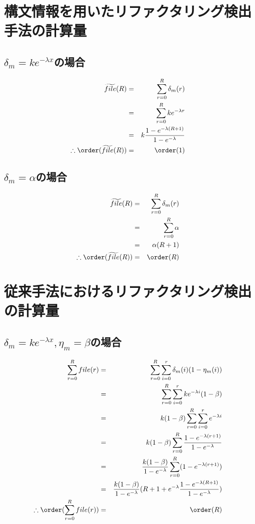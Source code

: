\section{構文情報を用いたリファクタリング検出手法の計算量}\label{appendix:computation}
\subsection{$\delta_m = k e^{-\lambda x}$の場合}
\begin{eqnarray*}
	\widetilde{file}(R) &=& \sum_{r=0}^R \delta_m (r) \\
	&=& \sum_{r=0}^R ke^{-\lambda r} \\
	&=& k \frac{1 - e^{-\lambda (R+1)}}{1 - e^{- \lambda}} \\
	\therefore \order(\widetilde{file}(R)) &=& \order(1)
\end{eqnarray*}
\subsection{$\delta_m = \alpha$の場合}
\begin{eqnarray*}
	\widetilde{file}(R) &=& \sum_{r=0}^R \delta_m (r) \\
	&=& \sum_{r=0}^R \alpha \\
	&=& \alpha (R + 1 ) \\
	\therefore \order(\widetilde{file}(R)) &=& \order(R)
\end{eqnarray*}

\section{従来手法におけるリファクタリング検出の計算量}
\subsection{$\delta_m = k e^{-\lambda x}, \eta_m = \beta$の場合}
\begin{eqnarray*}
	\sum_{r=0}^R file(r) &=& \sum_{r=0}^R \sum_{i=0}^r \delta_m(i) (1 - \eta_m(i)) \\
	&=& \sum_{r=0}^R \sum_{i=0}^r k e^{-\lambda i} (1 - \beta) \\
	&=& k (1 - \beta) \sum_{r=0}^R \sum_{i=0}^r e^{-\lambda i} \\
	&=& k (1 - \beta) \sum_{r=0}^R \frac{1 - e^{-\lambda (r+1)}}{1 - e^{- \lambda}} \\ 
	&=& \frac{k (1 - \beta)}{1 - e^{- \lambda}} \sum_{r=0}^R (1 - e^{-\lambda (r+1)}) \\ 
	&=& \frac{k (1 - \beta)}{1 - e^{- \lambda}} (R+1 + e^{- \lambda} \frac{1 - e^{-\lambda (R+1)}}{1 - e^{- \lambda}}) \\ 
	\therefore \order(\sum_{r=0}^R file(r)) &=& \order(R)
\end{eqnarray*}


